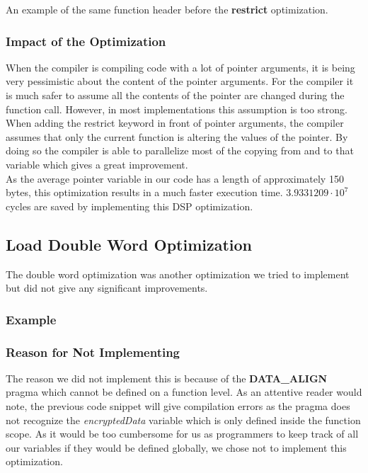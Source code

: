 \documentclass[a4paper]{article}
\begin{document}
An example of the same function header before the \textbf{restrict} optimization.


\subsubsection{Impact of the Optimization}

When the compiler is compiling code with a lot of pointer arguments, it is being very pessimistic about the content of the pointer arguments. For the compiler it is much safer to assume all the contents of the pointer are changed during the function call. However, in most implementations this assumption is too strong. When adding the restrict keyword in front of pointer arguments, the compiler assumes that only the current function is altering the values of the pointer. By doing so the compiler is able to parallelize most of the copying from and to that variable which gives a great improvement.\\

As the average pointer variable in our code has a length of approximately 150 bytes, this optimization results in a much faster execution time. $3.9331209 \cdot 10^{7}$ cycles are saved by implementing this DSP optimization.

\subsection{Load Double Word Optimization}
The double word optimization was another optimization we tried to implement but did not give any significant improvements.

\subsubsection{Example}



\subsubsection{Reason for Not Implementing}

The reason we did not implement this is because of the \textbf{DATA\_ALIGN} pragma which cannot be defined on a function level. As an attentive reader would note, the previous code snippet will give compilation errors as the pragma does not recognize the \textit{encryptedData} variable which is only defined inside the function scope. As it would be too cumbersome for us as programmers to keep track of all our variables if they would be defined globally, we chose not to implement this optimization.
\end{document}
